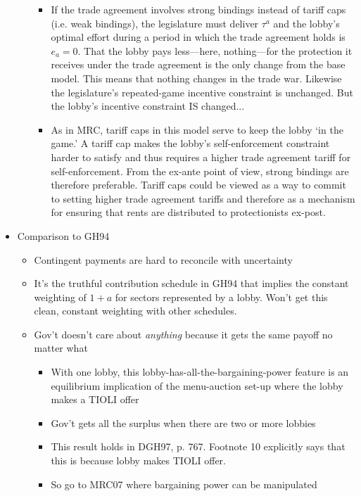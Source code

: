\documentclass[12pt]{article}
\begin{document}
\begin{itemize}
\begin{itemize}
					\begin{itemize}
						\item If the trade agreement involves strong bindings instead of tariff caps (i.e. weak bindings), the legislature must deliver $\tau^a$ and the lobby's optimal effort during a period in which the trade agreement holds is $e_a = 0$. That the lobby pays less---here, nothing---for the protection it receives under the trade agreement is the only change from the base model. This means that nothing changes in the trade war. Likewise the legislature's repeated-game incentive constraint is unchanged. But the lobby's incentive constraint IS changed...
						\item As in MRC, tariff caps in this model serve to keep the lobby `in the game.' A tariff cap makes the lobby's self-enforcement constraint harder to satisfy and thus requires a higher trade agreement tariff for self-enforcement. From the ex-ante point of view, strong bindings are therefore preferable. Tariff caps could be viewed as a way to commit to setting higher trade agreement tariffs and therefore as a mechanism for ensuring that rents are distributed to protectionists ex-post.
					\end{itemize}
			\end{itemize}
		\item Comparison to GH94
			\begin{itemize}
				\item Contingent payments are hard to reconcile with uncertainty
				\item It's the truthful contribution schedule in GH94 that implies the constant weighting of $1+a$ for sectors represented by a lobby. Won't get this clean, constant weighting with other schedules.
				\item Gov't doesn't care about \textit{anything} because it gets the same payoff no matter what
					\begin{itemize}
						\item With one lobby, this lobby-has-all-the-bargaining-power feature is an equilibrium implication of the menu-auction set-up where the lobby makes a TIOLI offer
						\item Gov't gets all the surplus when there are two or more lobbies
						\item This result holds in DGH97, p. 767. Footnote 10 explicitly says that this is because lobby makes TIOLI offer.
						\item So go to MRC07 where bargaining power can be manipulated
					\end{itemize}

\end{itemize}
\end{itemize}
\end{document}
